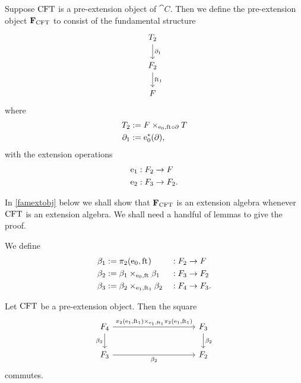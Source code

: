 \begin{defn}
Suppose $\mathrm{CFT}$ is a pre-extension object of $\cat{C}$. Then we define the pre-extension object
$\mathbf{F}_{\mathrm{CFT}}$ to consist of the fundamental structure
\begin{equation*}
\begin{tikzcd}
\stesyst_2
  \ar{d}{\ebd[1]}
  \\
\stesysf_2
  \ar{d}{\eft[1]}
  \\
\stesysf
\end{tikzcd}
\end{equation*}
where
\begin{align*}
\stesyst_2 
  & := \pullback{\stesysf}{\stesyst}{\ectxext}{\eft\circ\ebd}
  \\
\ebd[1]
  & := \ectxext^\ast(\ebd),
\end{align*}
with the extension operations
\begin{align*}
\mathrm{e}_{1} 
  & 
  : F_2\to F\\
\mathrm{e}_{2} & : F_3\to F_2.
\end{align*}
\end{defn}

In \autoref{famextobj} below we shall show that $\mathbf{F}_{\mathrm{CFT}}$ is an
extension algebra whenever $\mathrm{CFT}$ is an extension algebra. We shall need
a handful of lemmas to give the proof.

\begin{defn}
We define
\begin{align*}
\beta_1 
  & := 
\pullbackpr{2}{\ectxext}{\eft}
  & &
  : \stesysf_2\to\stesysf
  \\
\beta_2
  & :=
\pullback{\beta_1}{\beta_1}{\ectxext}{\eft}
  & &
  : \stesysf_3\to\stesysf_2
  \\
\beta_3
  & :=
\pullback{\beta_2}{\beta_2}{\efamext}{\eft[1]}
  & &
  : \stesysf_4\to\stesysf_3.
\end{align*}
\end{defn}

\begin{lem}
Let $\mathrm{CFT}$ be a pre-extension object. Then the square
\begin{equation*}
\begin{tikzcd}[column sep=10em]
\stesysf_4
  \ar{r}{\pullback{\pullbackpr{2}{\efamext}{\eft[1]}}{\pullbackpr{2}{\efamext}{\eft[1]}}{\efamext}{\eft[1]}}
  \ar{d}[swap]{\beta_3}
  &
\stesysf_3
  \ar{d}{\beta_2}
  \\
\stesysf_3
  \ar{r}[swap]{\beta_2}
  &
\stesysf_2
\end{tikzcd}
\end{equation*}
commutes.
\end{lem}

